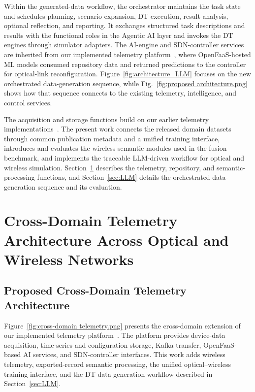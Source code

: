 \documentclass[9pt,twocolumn,twoside]{osajnl}
\begin{document}
Within the generated-data workflow, the orchestrator maintains the task state and schedules planning, scenario expansion, DT execution, result analysis, optional reflection, and reporting. It exchanges structured task descriptions and results with the functional roles in the Agentic AI layer and invokes the DT engines through simulator adapters. The AI-engine and SDN-controller services are inherited from our implemented telemetry platform~\cite{shen2025telemetry}, where OpenFaaS-hosted ML models consumed repository data and returned predictions to the controller for optical-link reconfiguration. Figure~\ref{fig:architecture_LLM} focuses on the new orchestrated data-generation sequence, while Fig.~\ref{fig:proposed architecture.png} shows how that sequence connects to the existing telemetry, intelligence, and control services.

The acquisition and storage functions build on our earlier telemetry implementations~\cite{shen2025telemetry,Shen2026OFCdata}. The present work connects the released domain datasets through common publication metadata and a unified training interface, introduces and evaluates the wireless semantic modules used in the fusion benchmark, and implements the traceable LLM-driven workflow for optical and wireless simulation. Section~\ref{sec:cross-domain-telemetry} describes the telemetry, repository, and semantic-processing functions, and Section~\ref{sec:LLM} details the orchestrated data-generation sequence and its evaluation.

\section{Cross-Domain Telemetry Architecture Across Optical and Wireless Networks}
\label{sec:cross-domain-telemetry}

\subsection{Proposed Cross-Domain Telemetry Architecture}
\label{subsec:4.A}

Figure~\ref{fig:cross-domain telemetry.png} presents the cross-domain extension of our implemented telemetry platform~\cite{shen2025telemetry}. The platform provides device-data acquisition, time-series and configuration storage, Kafka transfer, OpenFaaS-based AI services, and SDN-controller interfaces. This work adds wireless telemetry, exported-record semantic processing, the unified optical--wireless training interface, and the DT data-generation workflow described in Section~\ref{sec:LLM}.
\end{document}
